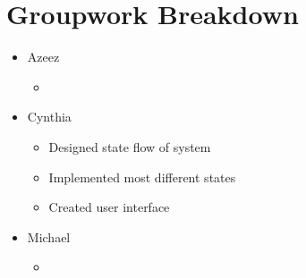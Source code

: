 \documentclass{article}
\begin{document}
\section{Groupwork Breakdown}
\begin{itemize}
    \item Azeez
          \begin{itemize}
              \item
          \end{itemize}
    \item Cynthia
          \begin{itemize}
              \item Designed state flow of system
              \item Implemented most different states
              \item Created user interface
          \end{itemize}
    \item Michael
          \begin{itemize}
              \item
          \end{itemize}
\end{itemize}



\end{document}
